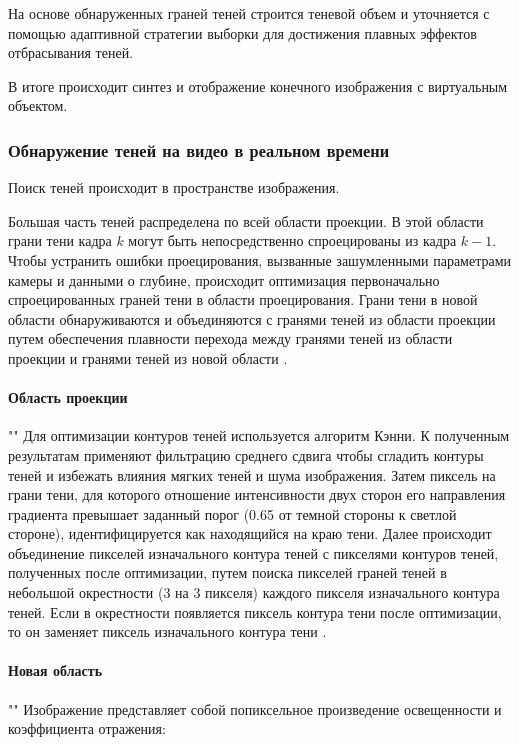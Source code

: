 На основе обнаруженных граней теней строится теневой объем и уточняется с помощью адаптивной стратегии выборки \cite{THOMASIAN2022385} для достижения плавных эффектов отбрасывания теней.

В итоге происходит синтез и отображение конечного изображения с виртуальным объектом.

\subsubsection*{Обнаружение теней на видео в реальном времени}

Поиск теней происходит в пространстве изображения. 

Большая часть теней распределена по всей области проекции. В этой области грани тени кадра $k$ могут быть непосредственно спроецированы из кадра $k - 1$. Чтобы устранить ошибки проецирования, вызванные зашумленными параметрами камеры и данными о глубине, происходит оптимизация первоначально спроецированных граней тени в области проецирования. Грани тени в новой области обнаруживаются и объединяются с гранями теней из области проекции путем обеспечения плавности перехода между гранями теней из области проекции и гранями теней из новой области \cite{wei2019simulating}.

\paragraph*{Область проекции} 
""\newline\indent
Для оптимизации контуров теней используется алгоритм Кэнни. К полученным результатам применяют фильтрацию среднего сдвига чтобы сгладить контуры теней и избежать влияния мягких теней и шума изображения. Затем пиксель на грани тени, для которого отношение интенсивности двух сторон его направления градиента превышает заданный порог (0.65 от темной стороны к светлой стороне), идентифицируется как находящийся на краю тени. Далее происходит объединение пикселей изначального контура теней с пикселями контуров теней, полученных после оптимизации, путем поиска пикселей граней теней в небольшой окрестности (3 на 3 пикселя) каждого пикселя изначального контура теней. Если в окрестности появляется пиксель контура тени после оптимизации, то он заменяет пиксель изначального контура тени \cite{wei2019simulating}.

\paragraph*{Новая область} 
""\newline\indent
Изображение представляет собой попиксельное произведение освещенности и коэффициента отражения: 

